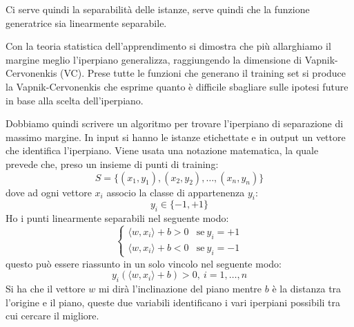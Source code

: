 Ci serve quindi la separabilità delle istanze, serve quindi che la funzione generatrice
sia linearmente separabile.
\begin{teorema}
    Con la teoria statistica dell'apprendimento si dimostra che più allarghiamo
    il margine meglio l'iperpiano generalizza, raggiungendo la dimensione di
    Vapnik-Cervonenkis (VC). Prese tutte le funzioni che generano il training
    set si produce la Vapnik-Cervonenkis che esprime quanto è difficile sbagliare
    sulle ipotesi future in base alla scelta dell'iperpiano.
\end{teorema}
Dobbiamo quindi scrivere un algoritmo per trovare l'iperpiano di separazione di
massimo margine. In input si hanno le istanze etichettate e in output un vettore
che identifica l'iperpiano. Viene usata una notazione matematica, la quale prevede
che, preso un insieme di punti di training:
\begin{equation}
    S = \{(x_1, y_1), (x_2, y_2),\dots, (x_n, y_n)\}
\end{equation}
dove ad ogni vettore $x_i$ associo la classe di appartenenza $y_i$:
\begin{equation}
    y_i \in \{-1, +1\}
\end{equation}
Ho i punti linearmente separabili nel seguente modo:
\begin{equation}
    \begin{cases}
        \langle w, x_i \rangle + b > 0 & \text{se} \ y_i = +1 \\
        \langle w, x_i \rangle + b < 0 & \text{se} \ y_i = -1
    \end{cases}
\end{equation}
questo può essere riassunto in un solo vincolo nel seguente modo:
\begin{equation}
    y_i(\langle w, x_i\rangle + b) > 0, \  i = 1,\dots, n
\end{equation}
Si ha che il vettore $w$ mi dirà l'inclinazione del piano mentre $b$ è la distanza
tra l'origine e il piano, queste due variabili identificano i vari iperpiani
possibili tra cui cercare il migliore.

